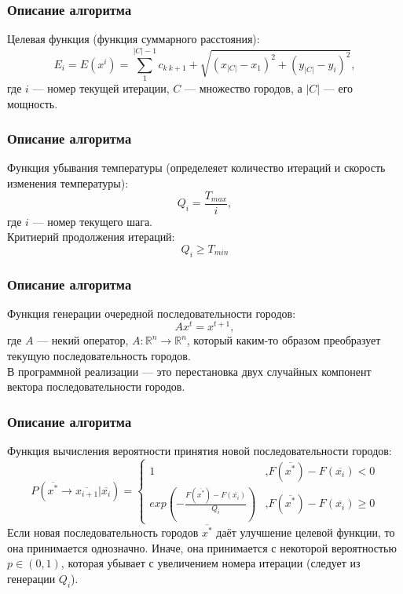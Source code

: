 \documentclass[12pt]{beamer}
\begin{document}
\begin{frame}
\frametitle{Описание алгоритма}
Целевая функция (функция суммарного расстояния):
$$E_{i} = E(x^{i}) = \sum\limits_{1}^{|C|-1} c_{k \: k+1} + \sqrt{(x_{|C|} - x_1)^2 + (y_{|C|} - y_i)^2},$$
где $i$ --- номер текущей итерации, $C$ --- множество городов, а $|C|$ --- его мощность.
\end{frame}

\begin{frame}
\frametitle{Описание алгоритма}
Функция убывания температуры (определеяет количество итераций и скорость изменения температуры):
$$Q_{i} = \frac{T_{max}}{i},$$
где $i$ --- номер текущего шага.
\\
Критиерий продолжения итераций:
$$Q_{i} \geq T_{min}$$
\end{frame}

\begin{frame}
\frametitle{Описание алгоритма}
Функция генерации очередной последовательности городов:
$$Ax^{t} = x^{t+1},$$
где $A$ --- некий оператор, $A: \mathbb{R}^{n} \rightarrow \mathbb{R}^{n}$, который каким-то образом преобразует текущую последовательность городов.
\\
В программной реализации --- это перестановка двух случайных компонент вектора последовательности городов.
\end{frame}

\begin{frame}
\frametitle{Описание алгоритма}
Функция вычисления вероятности принятия новой последовательности городов:
\begin{equation*}
P(\overline{x^{*}} \rightarrow \overline{x_{i+1}} | \overline{x_{i}}) = 
\begin{cases}
1 &\text{,$F(\overline{x^{*}}) - F(\overline{x_{i}}) < 0$}\\
exp(-\frac{F(\overline{x^{*}}) - F(\overline{x_{i}})}{Q_{i}}) &\text{,$F(\overline{x^{*}}) - F(\overline{x_{i}}) \geq 0$}
\end{cases}
\end{equation*}
Если новая последовательность городов $\overline{x^{*}}$ даёт улучшение целевой функции, то она принимается однозначно. Иначе, она принимается с некоторой вероятностью $p \in (0, 1)$, которая убывает с увеличением номера итерации (следует из генерации $Q_{i}$).
\end{frame}
\end{document}
